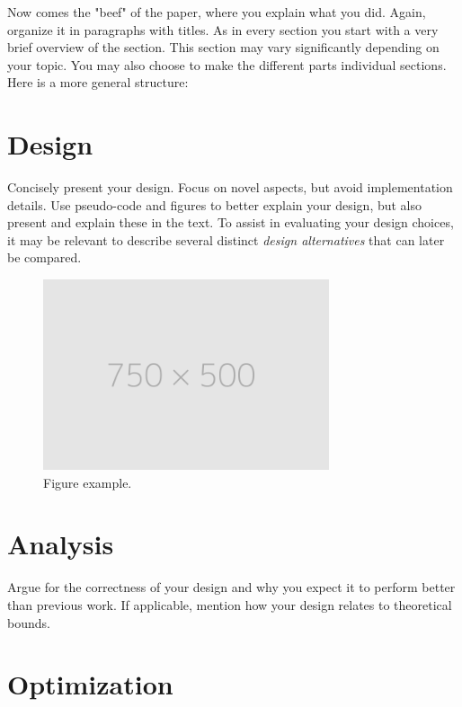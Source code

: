 Now comes the "beef" of the paper, where you explain what you did. Again, organize it in paragraphs with titles. As in every section you start with a very brief overview of the section. This section may vary significantly depending on your topic. You may also choose to make the different parts individual sections. Here is a more general structure:

\section{Design} \label{sec:design}

Concisely present your design. Focus on novel aspects, but avoid implementation details. Use pseudo-code and figures to better explain your design, but also present and explain these in the text. To assist in evaluating your design choices, it may be relevant to describe several distinct \textit{design alternatives} that can later be compared.

\begin{figure}[H]
    \centering
    \includegraphics[width=0.75\textwidth]{Fig/placeholder.png}
    \caption{Figure example.}
    \label{fig:figure}
\end{figure}

\section{Analysis} \label{sec:analysis}

Argue for the correctness of your design and why you expect it to perform better than previous work. If applicable, mention how your design relates to theoretical bounds.

\section{Optimization} \label{sec:optimization}

